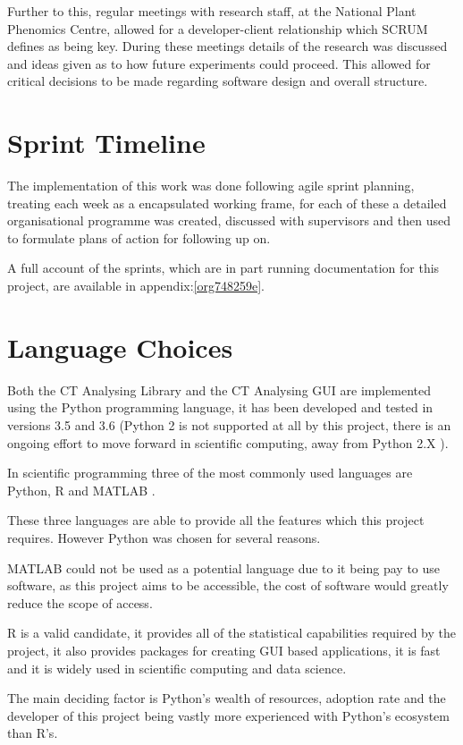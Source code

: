 \documentclass[11pt]{report}
\begin{document}
Further to this, regular meetings with research staff, at the National Plant Phenomics Centre,  allowed for a developer-client relationship which SCRUM defines as being key. During these meetings details of the research was discussed and ideas given as to how future experiments could proceed. This allowed for critical decisions to be made regarding software design and overall structure.
\section{Sprint Timeline}
\label{sec:orgd560da0}
The implementation of this work was done following agile sprint planning, treating each week as a encapsulated working frame, for each of these a detailed organisational programme was created, discussed with supervisors and then used to formulate plans of action for following up on.

A full account of the sprints, which are in part running documentation for this project, are available in appendix:\ref{org748259e}.

\section{Language Choices}
\label{sec:org5407a6a}
Both the CT Analysing Library and the CT Analysing GUI are implemented using the Python programming language, it has been developed and tested in versions 3.5 and 3.6 (Python 2 is not supported at all by this project, there is an ongoing effort to move forward in scientific computing, away from Python 2.X  \cite{Ozgur2016}).

In scientific programming three of the most commonly used languages are Python, R and MATLAB \cite{Ozgur2016}.

These three languages are able to provide all the features which this project requires. However Python was chosen for several reasons.

MATLAB could not be used as a potential language due to it being pay to use software, as this project aims to be accessible, the cost of software would greatly reduce the scope of access.

R is a valid candidate, it provides all of the statistical capabilities required by the project, it also provides packages for creating GUI based applications, it is fast and it is widely used in scientific computing and data science.

The main deciding factor is Python's wealth of resources, adoption rate and the developer of this project being vastly more experienced with Python's ecosystem than R's.
\end{document}

